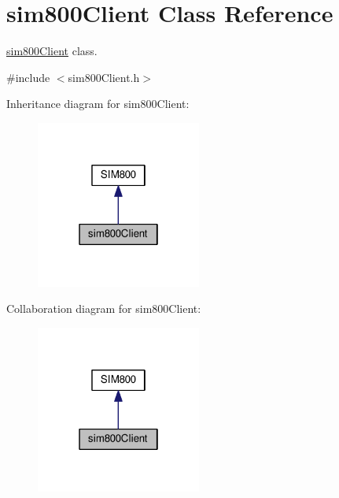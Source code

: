 \hypertarget{classsim800Client}{}\section{sim800\+Client Class Reference}
\label{classsim800Client}


\hyperlink{classsim800Client}{sim800\+Client} class.  




{\ttfamily \#include $<$sim800\+Client.\+h$>$}



Inheritance diagram for sim800\+Client\+:\nopagebreak
\begin{figure}[H]
\begin{center}
\leavevmode
\includegraphics[width=154pt]{classsim800Client__inherit__graph}
\end{center}
\end{figure}


Collaboration diagram for sim800\+Client\+:\nopagebreak
\begin{figure}[H]
\begin{center}
\leavevmode
\includegraphics[width=154pt]{classsim800Client__coll__graph}
\end{center}
\end{figure}
